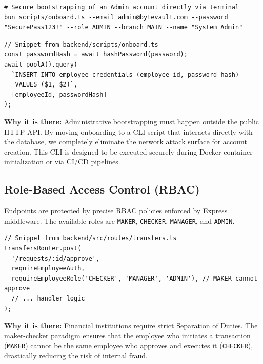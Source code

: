 \begin{lstlisting}[style=bash]
# Secure bootstrapping of an Admin account directly via terminal
bun scripts/onboard.ts --email admin@bytevault.com --password "SecurePass123!" --role ADMIN --branch MAIN --name "System Admin"
\end{lstlisting}

\begin{lstlisting}[style=typescript]
// Snippet from backend/scripts/onboard.ts
const passwordHash = await hashPassword(password);
await poolA().query(
  `INSERT INTO employee_credentials (employee_id, password_hash)
   VALUES ($1, $2)`,
  [employeeId, passwordHash]
);
\end{lstlisting}

\textbf{Why it is there:} Administrative bootstrapping must happen outside the public HTTP API. By moving onboarding to a CLI script that interacts directly with the database, we completely eliminate the network attack surface for account creation. This CLI is designed to be executed securely during Docker container initialization or via CI/CD pipelines.

\subsection{Role-Based Access Control (RBAC)}
Endpoints are protected by precise RBAC policies enforced by Express middleware. The available roles are \texttt{MAKER}, \texttt{CHECKER}, \texttt{MANAGER}, and \texttt{ADMIN}.

\begin{lstlisting}[style=typescript]
// Snippet from backend/src/routes/transfers.ts
transfersRouter.post(
  '/requests/:id/approve',
  requireEmployeeAuth,
  requireEmployeeRole('CHECKER', 'MANAGER', 'ADMIN'), // MAKER cannot approve
  // ... handler logic
);
\end{lstlisting}

\textbf{Why it is there:} Financial institutions require strict Separation of Duties. The maker-checker paradigm ensures that the employee who initiates a transaction (\texttt{MAKER}) cannot be the same employee who approves and executes it (\texttt{CHECKER}), drastically reducing the risk of internal fraud.
